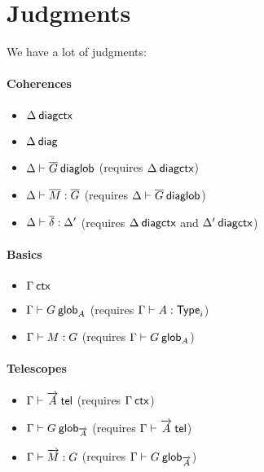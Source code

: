 \section{Judgments}

We have a lot of judgments:

\paragraph{Coherences}

\begin{itemize}
\item ${\Delta} \: \mathsf{diagctx}$
\item $\Delta \: \mathsf{diag}$
\item ${\Delta} \vdash {\ensuremath{\overline{G}}} \: \mathsf{diaglob}$ (requires ${\Delta} \: \mathsf{diagctx}$)
\item ${\Delta} \vdash {\ensuremath{\overline{M}}} : {\overline{G}}$
(requires ${\Delta} \vdash {\ensuremath{\overline{G}}} \: \mathsf{diaglob}$)
\item ${\Delta} \vdash {\ensuremath{\overline{\delta}}} : {\Delta'}$
(requires ${\Delta} \: \mathsf{diagctx}$ and ${\Delta'} \: \mathsf{diagctx}$)
\end{itemize}

\paragraph{Basics}

\begin{itemize}
\item ${\Gamma} \: \mathsf{ctx}$
\item ${\Gamma} \vdash {G} \: \mathsf{glob}_{A}$ (requires ${\Gamma} \vdash {A} : {\mathsf{Type}_{i}}$)
\item ${\Gamma} \vdash {M} : {G}$ (requires ${\Gamma} \vdash {G} \: \mathsf{glob}_{A}$)
\end{itemize}

\paragraph{Telescopes}

\begin{itemize}
\item ${\Gamma} \vdash {\ensuremath{\overrightarrow{A}}} \: \mathsf{tel}$ (requires ${\Gamma} \: \mathsf{ctx}$)
\item ${\Gamma} \vdash {G} \: \mathsf{glob}_{\overrightarrow{A}}$ (requires ${\Gamma} \vdash {\ensuremath{\overrightarrow{A}}} \: \mathsf{tel}$)
\item ${\Gamma} \vdash {\ensuremath{\overrightarrow{M}}} : {G}$
(requires ${\Gamma} \vdash {G} \: \mathsf{glob}_{\overrightarrow{A}}$)
\end{itemize}

